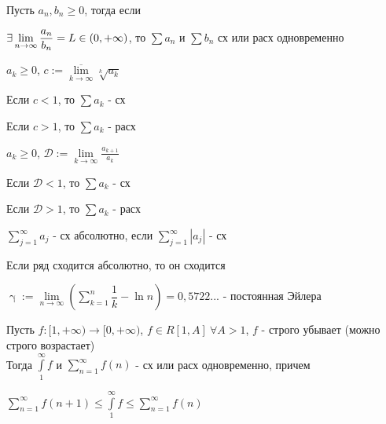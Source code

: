 \documentclass[main]{subfiles}
\begin{document}
    \begin{consequence} 
        Пусть $a_n, b_n \geqslant 0$, тогда если

        $\exists \lim\limits_{n \rightarrow \infty} \dfrac{a_n}{b_n} = L \in (0, + \infty)$, то $\sum a_n$ и $\sum b_n$ сх или расх одновременно
    \end{consequence}

    \begin{theorem} 
        $a_k \geqslant 0$, $c:=\overline{\lim\limits_{k \rightarrow \infty}} \sqrt[k]{a_k}$

        Если $c < 1$, то $\sum a_k$ - сх

        Если $c > 1$, то $\sum a_k$ - расх
    \end{theorem}

    \begin{theorem} 
        $a_k \geqslant 0$, $\mathcal{D}:=\lim\limits_{k \rightarrow \infty} \frac{a_{k+1}}{a_k}$

        Если $\mathcal{D} < 1$, то $\sum a_k$ - сх

        Если $\mathcal{D} > 1$, то $\sum a_k$ - расх
    \end{theorem}

    \begin{definition}
        $\sum\limits_{j=1}^\infty a_j$ - сх абсолютно, если $\sum\limits_{j=1}^\infty |a_j|$ - сх
    \end{definition}

    \begin{theorem}
        Если ряд сходится абсолютно, то он сходится
    \end{theorem}

    \begin{definition}
        $\upgamma := \lim\limits_{n \rightarrow \infty} (\sum\limits_{k=1}^n \dfrac{1}{k} - \ln n) = 0,5722...$ - постоянная Эйлера
    \end{definition}

    \begin{theorem}
        Пусть $f: [1, +\infty) \rightarrow [0, +\infty)$, $f \in R[1,A]\ \forall A > 1$, $f$ - строго убывает (можно строго возрастает)
        \\
        Тогда $\int\limits_1^\infty f$ и $\sum\limits_{n=1}^\infty f(n)$ - сх или расх одновременно, причем

        $\sum\limits_{n=1}^\infty f(n+1) \leqslant \int\limits_1^\infty f \leqslant \sum\limits_{n=1}^{\infty} f(n)$
      \end{theorem}
\end{document}
